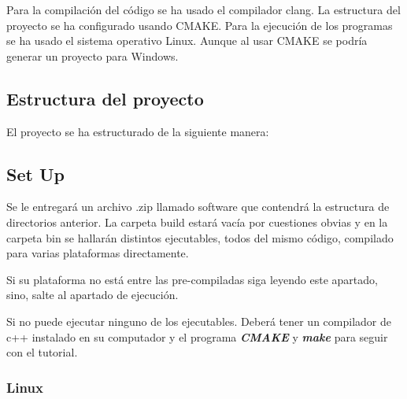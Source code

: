 \documentclass[a4paper, 12.5pt]{report}
\begin{document}
Para la compilación del código se ha usado el compilador clang. La estructura del proyecto se ha configurado usando CMAKE. Para la ejecución de los programas se ha usado el sistema operativo Linux. Aunque al usar CMAKE se podría generar un proyecto para Windows.

\subsection{Estructura del proyecto}

El proyecto se ha estructurado de la siguiente manera:




\subsection{Set Up}

Se le entregará un archivo .zip llamado software que contendrá la estructura de directorios anterior. La carpeta build estará vacía por cuestiones obvias y en la carpeta bin se hallarán distintos ejecutables, todos del mismo código, compilado para varias plataformas directamente.

Si su plataforma no está entre las pre-compiladas siga leyendo este apartado, sino, salte al apartado de ejecución.

Si no puede ejecutar ninguno de los ejecutables. Deberá tener un compilador de c++ instalado en su computador y el programa \textbf{\textit{CMAKE}} y \textbf{\textit{make}}  para seguir con el tutorial.


\subsubsection*{Linux}
\end{document}
